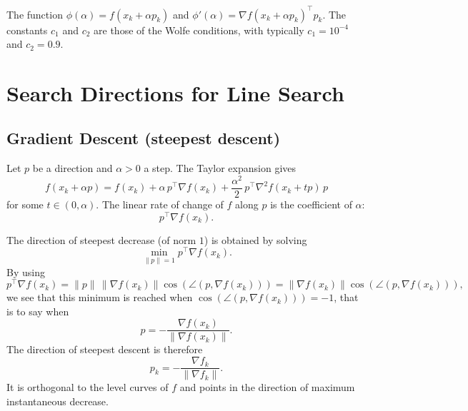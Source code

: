 \begin{remarque}
The function $\phi(\alpha) = f(x_k + \alpha p_k)$ and $\phi'(\alpha) = \nabla f(x_k + \alpha p_k)^\top p_k$.
The constants $c_1$ and $c_2$ are those of the Wolfe conditions, with typically $c_1 = 10^{-4}$ and $c_2 = 0.9$.
\end{remarque}

\section{Search Directions for Line Search}
\label{sec:2.4}

\subsection{Gradient Descent (steepest descent)}
\label{subsec:2.4.1}

Let $p$ be a direction and $\alpha>0$ a step. The Taylor expansion gives
\[
    f(x_k + \alpha p)
    = f(x_k) + \alpha\,p^\top \nabla f(x_k)
      + \frac{\alpha^2}{2}\,p^\top \nabla^2 f(x_k + t p)\,p
\]
for some $t \in (0,\alpha)$. The linear rate of change of $f$ along
$p$ is the coefficient of $\alpha$:
\[
    p^\top \nabla f(x_k).
\]

The direction of steepest decrease (of norm $1$) is obtained by solving
\[
    \min_{\|p\|=1} p^\top \nabla f(x_k).
\]
By using
\[
    p^\top \nabla f(x_k)
    = \|p\|\,\|\nabla f(x_k)\|
      \cos(\angle(p,\nabla f(x_k)))
    = \|\nabla f(x_k)\|
      \cos(\angle(p,\nabla f(x_k))),
\]
we see that this minimum is reached when
$\cos(\angle(p,\nabla f(x_k))) = -1$, that is to say when
\[
    p = -\frac{\nabla f(x_k)}{\|\nabla f(x_k)\|}.
\]
The direction of steepest descent is therefore
\begin{equation}
    p_k = -\frac{\nabla f_k}{\|\nabla f_k\|}.
\end{equation}
It is orthogonal to the level curves of $f$ and points in the direction of
maximum instantaneous decrease.

